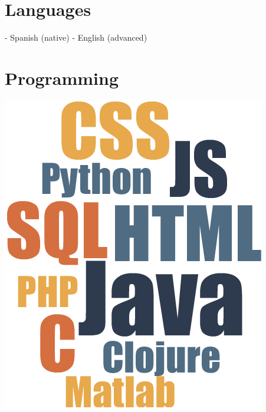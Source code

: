\documentclass[]{friggeri-cv}
\begin{document}
\begin{aside}
  \section{Languages}
    - Spanish (native)
    - English (advanced)
    ~       
  \section{Programming}
    \includegraphics[scale=0.9]{img/cloud.png}
    ~    
\end{aside}
~
\\ [0.8cm]
\end{document}
